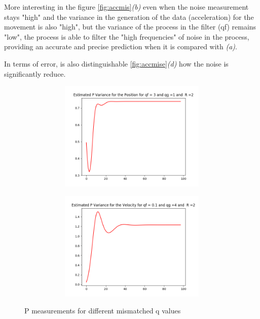 \documentclass{article}
\begin{document}
        More interesting in the figure \ref{fig:accmis}\textit{(b)}  even when the noise measurement stays "high" and the variance in the generation
        of the data (acceleration) for the movement is also "high", but the variance of the process in the filter (qf) remains "low", the process is 
        able to filter the "high frequencies" of noise in the process, providing an accurate and precise prediction when it is compared with \textit{(a)}.

        In terms of error, is also distinguishable \ref{fig:accmise}\textit{(d)} how the noise is significantly reduce.
        \begin{figure}[H]
            \centering 
            \begin{subfigure}{1\textwidth}  
                \begin{subfigure}{.5\textwidth}
                    \centering   
                    \includegraphics[width=.6\linewidth]{./img/acc/P11_qf3_qg1_r2.png}
                    \caption{}
                \end{subfigure}
                \begin{subfigure}{.5\textwidth}  
                    \centering 
                    \includegraphics[width=.6\linewidth]{./img/acc/P22_qf01_qg4_r2.png}
                    \caption{}
                \end{subfigure}
            \end{subfigure}
            \caption{P measurements for different mismatched q values}
            \label{fig:accmisp}
        \end{figure}
\end{document}
